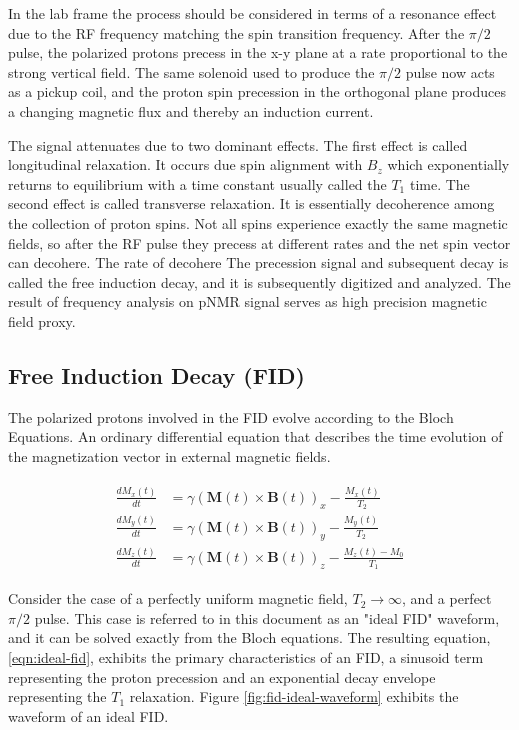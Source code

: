 In the lab frame the process should be considered in terms of a resonance effect due to the RF frequency matching the spin transition frequency.  After the $\pi/2$ pulse, the polarized protons precess in the x-y plane at a rate proportional to the strong vertical field.  The same solenoid used to produce the $\pi/2$ pulse now acts as a pickup coil, and the proton spin precession in the orthogonal plane produces a changing magnetic flux and thereby an induction current.  

The signal attenuates due to two dominant effects.  The first effect is called longitudinal relaxation.  It occurs due spin alignment with $B_z$ which exponentially returns to equilibrium with a time constant usually called the $T_1$ time.  The second effect is called transverse relaxation.  It is essentially decoherence among the collection of proton spins.  Not all spins experience exactly the same magnetic fields, so after the RF pulse they precess at different rates and the net spin vector can decohere.  The rate of decohere  The precession signal and subsequent decay is called the free induction decay, and it is subsequently digitized and analyzed.  The result of frequency analysis on pNMR signal serves as high precision magnetic field proxy.

\subsection{Free Induction Decay (FID)}

The polarized protons involved in the FID evolve according to the Bloch Equations.  An ordinary differential equation that describes the time evolution of the magnetization vector in external magnetic fields.

\begin{align}
\begin{split}
\label{eqn:bloch}
\frac{dM_x(t)}{dt} & = \gamma (\mathbf{M}(t) \times \mathbf{B}(t))_x - \frac{M_x(t)}{T_2} \\
\frac{dM_y(t)}{dt} & = \gamma (\mathbf{M}(t)\times \mathbf{B}(t))_y - \frac{M_y(t)}{T_2} \\
\frac{dM_z(t)}{dt} & = \gamma (\mathbf{M}(t) \times \mathbf{B}(t))_z - \frac{M_z(t) - M_0}{T_1}
\end{split} 
\end{align}

Consider the case of a perfectly uniform magnetic field, $T_2 \rightarrow \infty$, and a perfect $\pi/2$ pulse. This case is referred to in this document as an "ideal FID" waveform, and it can be solved exactly from the Bloch equations.  The resulting equation, \ref{eqn:ideal-fid}, exhibits the primary characteristics of an FID, a sinusoid term representing the proton precession and an exponential decay envelope representing the $T_1$ relaxation.  Figure \ref{fig:fid-ideal-waveform} exhibits the waveform of an ideal FID.

